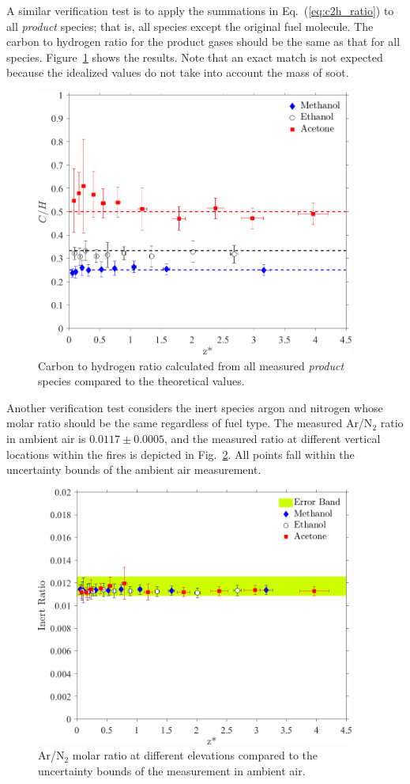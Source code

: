 \documentclass[12pt]{article}
\begin{document}
A similar verification test is to apply the summations in Eq.~(\ref{eq:c2h_ratio}) to all {\em product} species; that is, all species except the original fuel molecule. The carbon to hydrogen ratio for the product gases should be the same as that for all species. Figure~\ref{fig:SCR} shows the results. Note that an exact match is not expected because the idealized values do not take into account the mass of soot.
\begin{figure}[h!]
	\centering
\includegraphics[width=10.5cm, keepaspectratio]{Prod_ratio_Comparison.png}
	\caption[Carbon to hydrogen ratio calculated from all {\em product} species]{Carbon to hydrogen ratio calculated from all measured {\em product} species compared to the theoretical values.}
	\label{fig:SCR}
\end{figure}

Another verification test considers the inert species argon and nitrogen whose molar ratio should be the same regardless of fuel type. The measured Ar/N$_2$ ratio in ambient air is $0.0117\pm0.0005$, and the measured ratio at different vertical locations within the fires is depicted in Fig.~\ref{fig:IR}. All points fall within the uncertainty bounds of the ambient air measurement.
\begin{figure}[h!]
	\centering
\includegraphics[width=10.5cm, keepaspectratio]{Inert_ratio_Comparison.png}
	\caption[Ar/N$_2$ ratio within the fire envelop compared to ambient air]{Ar/N$_2$ molar ratio at different elevations compared to the uncertainty bounds of the measurement in ambient air.}
	\label{fig:IR}
\end{figure}
\end{document}
